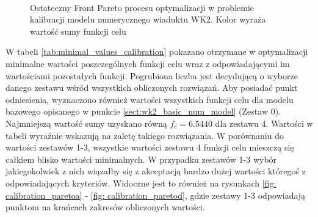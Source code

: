 \begin{figure}[hbt!]
	\centering
	 \quad
	 \\
	 \qquad
	\captionsetup{justification=centering}
	\caption{Ostateczny Front Pareto procesu optymalizacji w problemie kalibracji modelu numerycznego wiaduktu WK2. Kolor wyraża wartość sumy funkcji celu}
	\label{fig: calibration_pareto}
\end{figure}

W tabeli \ref{tab:minimal_values_calibration} pokazano otrzymane w optymalizacji minimalne wartości poszczególnych funkcji celu wraz z odpowiadającymi im wartościami pozostałych funkcji. Pogrubiona liczba jest decydującą o wyborze danego zestawu wśród wszystkich obliczonych rozwiązań. Aby posiadać punkt odniesienia, wyznaczono również wartości wszystkich funkcji celu dla modelu bazowego opisanego w punkcie \ref{sect:wk2_basic_num_model} (Zestaw 0). Najmniejszą wartość sumy uzyskano równą $f_c=6.5440$ dla zestawu 4. Wartości w tabeli wyraźnie wskazują na zaletę takiego rozwiązania. W porównaniu do wartości zestawów 1-3, wszystkie wartości zestawu 4 funkcji celu mieszczą się całkiem blisko wartości minimalnych. W przypadku zestawów 1-3 wybór jakiegokolwiek z nich wiązałby się z akceptacją bardzo dużej wartości któregoś z odpowiadających kryteriów. Widoczne jest to również na rysunkach \ref{fig: calibration_paretoa} - \ref{fig: calibration_paretod}, gdzie zestawy 1-3 odpowiadają punktom na krańcach zakresów obliczonych wartości. %

